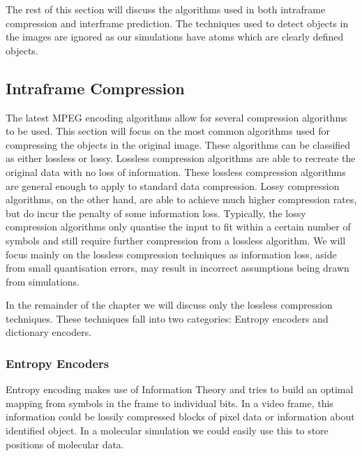 \documentclass[a4paper,11pt]{report}
\begin{document}
The rest of this section will discuss the algorithms used in both intraframe compression and interframe prediction. The techniques used to detect objects in the images are ignored as our simulations have atoms which are clearly defined objects.

\subsection{Intraframe Compression}
\label{back_intra}

The latest MPEG encoding algorithms allow for several compression algorithms to be used\cite{gall1991mvc}. This section will focus on the most common algorithms used for compressing the objects in the original image. These algorithms can be classified as either lossless or lossy. Lossless compression algorithms are able to recreate the original data with no loss of information. These lossless compression algorithms are general enough to apply to standard data compression. Lossy compression algorithms, on the other hand, are able to achieve much higher compression rates, but do incur the penalty of some information loss. Typically, the lossy compression algorithms only quantise the input to fit within a certain number of symbols and still require further compression from a lossless algorithm. We will focus mainly on the lossless compression techniques as information loss, aside from small quantisation errors, may result in incorrect assumptions being drawn from simulations.  

In the remainder of the chapter we will discuss only the lossless compression techniques. These techniques fall into two categories: Entropy encoders and dictionary encoders. 


\subsubsection*{Entropy Encoders}

Entropy encoding makes use of Information Theory and tries to build an optimal mapping from symbols in the frame to individual bits. In a video frame, this information could be lossily compressed blocks of pixel data or information about identified object. In a molecular simulation we could easily use this to store positions of molecular data.
\end{document}
